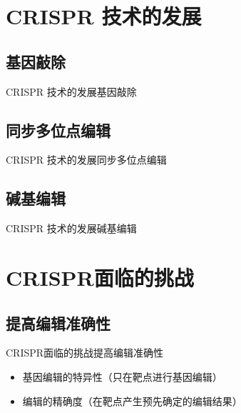 \documentclass{beamer}
\begin{document}

	\section{CRISPR 技术的发展}

	\subsection{基因敲除}
	\begin{frame}{CRISPR 技术的发展}{基因敲除}
		
	\end{frame}


	\subsection{同步多位点编辑}
	\begin{frame}{CRISPR 技术的发展}{同步多位点编辑}
		
	\end{frame}


	\subsection{碱基编辑}
	\begin{frame}{CRISPR 技术的发展}{碱基编辑}
		
	\end{frame}


	\section{CRISPR面临的挑战}
	\subsection{提高编辑准确性}
	\begin{frame}{CRISPR面临的挑战}{提高编辑准确性}
		\begin{itemize}
			\item 基因编辑的特异性（只在靶点进行基因编辑）
			\item 编辑的精确度（在靶点产生预先确定的编辑结果）
		\end{itemize}

	\end{frame}
\end{document}
